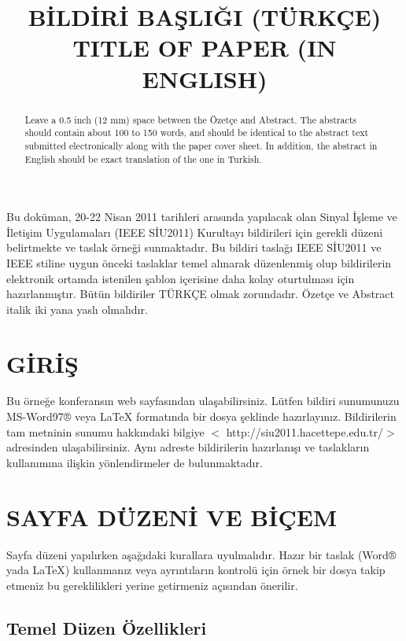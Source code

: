 \documentclass{article}
\title{BİLDİRİ BAŞLIĞI (TÜRKÇE)
\\TITLE OF PAPER (IN ENGLISH)}
\begin{document}
%

\begin{ozetce}
Bu doküman, 20-22 Nisan 2011 tarihleri arasında yapılacak olan Sinyal İşleme ve İletişim Uygulamaları (IEEE SİU2011) Kurultayı bildirileri için gerekli düzeni belirtmekte ve taslak örneği sunmaktadır.  Bu bildiri taslağı IEEE SİU2011 ve  IEEE stiline uygun önceki taslaklar temel alınarak düzenlenmiş olup bildirilerin elektronik ortamda istenilen şablon içerisine daha kolay oturtulması için hazırlanmıştır. Bütün bildiriler TÜRKÇE olmak zorundadır. Özetçe ve Abstract italik iki yana yaslı olmalıdır.
\end{ozetce}


\begin{abstract}
Leave a 0.5 inch (12 mm) space between the Özetçe and Abstract. The abstracts should contain about 100 to 150 words, and should be identical to the abstract text submitted electronically along with the paper cover sheet. In addition, the abstract in English should be exact translation of the one in Turkish.
\end{abstract}


\section{GİRİŞ}

Bu örneğe konferansın web sayfasından ulaşabilirsiniz. Lütfen
bildiri sunumunuzu MS-Word97® veya LaTeX formatında bir dosya
şeklinde hazırlayınız. Bildirilerin tam metninin sunumu hakkındaki
bilgiye $<$ http://siu2011.hacettepe.edu.tr/$>$ adresinden ulaşabilirsiniz.
Aynı adreste bildirilerin hazırlanışı ve taslakların kullanımına
ilişkin yönlendirmeler de bulunmaktadır.

\section{SAYFA DÜZENİ VE BİÇEM}

Sayfa düzeni yapılırken aşağıdaki kurallara uyulmalıdır. Hazır bir
taslak (Word® yada LaTeX) kullanmanız veya ayrıntıların kontrolü
için örnek bir dosya takip etmeniz bu gereklilikleri yerine getirmeniz
açısından önerilir.

\subsection{Temel Düzen Özellikleri}
\end{document}
